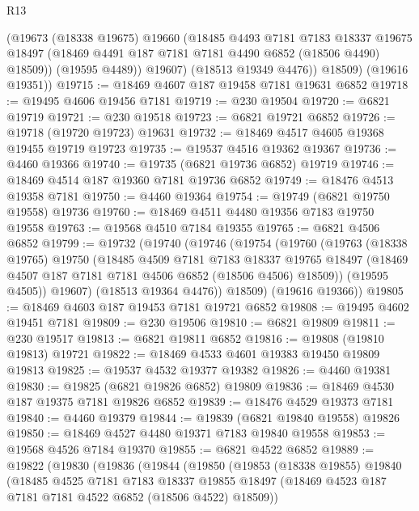 \begin{lexlean}{R13}
\begin{coremodule}
            (@19673
              (@18338 @19675)
              @19660
              (@18485
                @4493
                @7181
                @7183
                @18337
                @19675
                @18497
                (@18469 @4491 @187 @7181 @7181 @4490 @6852 (@18506 @4490) @18509))
              (@19595 @4489))
            @19607)
          (@18513 @19349 @4476))
        @18509)
      (@19616 @19351))
@19715 := @18469 @4607 @187 @19458 @7181 @19631 @6852
@19718 := @19495 @4606 @19456 @7181
@19719 := @230 @19504
@19720 := @6821 @19719
@19721 := @230 @19518
@19723 := @6821 @19721 @6852
@19726 := @19718 (@19720 @19723) @19631
@19732 := @18469 @4517 @4605 @19368 @19455 @19719 @19723
@19735 := @19537 @4516 @19362 @19367
@19736 := @4460 @19366
@19740 := @19735 (@6821 @19736 @6852) @19719
@19746 := @18469 @4514 @187 @19360 @7181 @19736 @6852
@19749 := @18476 @4513 @19358 @7181
@19750 := @4460 @19364
@19754 := @19749 (@6821 @19750 @19558) @19736
@19760 := @18469 @4511 @4480 @19356 @7183 @19750 @19558
@19763 := @19568 @4510 @7184 @19355
@19765 := @6821 @4506 @6852
@19799 := @19732
    (@19740
      (@19746
        (@19754
          (@19760
            (@19763
              (@18338 @19765)
              @19750
              (@18485
                @4509
                @7181
                @7183
                @18337
                @19765
                @18497
                (@18469 @4507 @187 @7181 @7181 @4506 @6852 (@18506 @4506) @18509))
              (@19595 @4505))
            @19607)
          (@18513 @19364 @4476))
        @18509)
      (@19616 @19366))
@19805 := @18469 @4603 @187 @19453 @7181 @19721 @6852
@19808 := @19495 @4602 @19451 @7181
@19809 := @230 @19506
@19810 := @6821 @19809
@19811 := @230 @19517
@19813 := @6821 @19811 @6852
@19816 := @19808 (@19810 @19813) @19721
@19822 := @18469 @4533 @4601 @19383 @19450 @19809 @19813
@19825 := @19537 @4532 @19377 @19382
@19826 := @4460 @19381
@19830 := @19825 (@6821 @19826 @6852) @19809
@19836 := @18469 @4530 @187 @19375 @7181 @19826 @6852
@19839 := @18476 @4529 @19373 @7181
@19840 := @4460 @19379
@19844 := @19839 (@6821 @19840 @19558) @19826
@19850 := @18469 @4527 @4480 @19371 @7183 @19840 @19558
@19853 := @19568 @4526 @7184 @19370
@19855 := @6821 @4522 @6852
@19889 := @19822
    (@19830
      (@19836
        (@19844
          (@19850
            (@19853
              (@18338 @19855)
              @19840
              (@18485
                @4525
                @7181
                @7183
                @18337
                @19855
                @18497
                (@18469 @4523 @187 @7181 @7181 @4522 @6852 (@18506 @4522) @18509))

\end{coremodule}
\end{lexlean}

